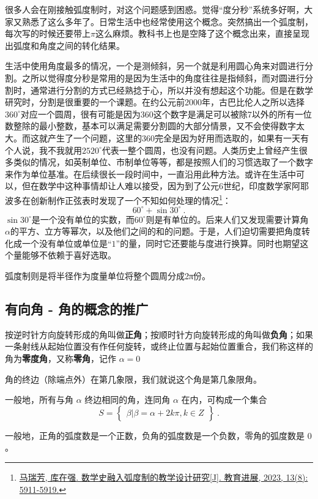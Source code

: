 很多人会在刚接触弧度制时，对这个问题感到困惑。觉得“度分秒”系统多好啊，大家又熟悉了这么多年了。日常生活中也经常使用这个概念。突然搞出一个弧度制，每次写的时候还要带上$\pi$这么麻烦。教科书上也是空降了这个概念出来，直接呈现出弧度和角度之间的转化结果。

生活中使用角度最多的情况，一个是测倾斜，另一个就是利用圆心角来对圆进行分割。之所以觉得度分秒是常用的是因为生活中的角度往往是指倾斜，而对圆进行分割时，通常进行分割的方式已经熟捻于心，所以并没有想起这个功能。但是在数学研究时，分割是很重要的一个课题。在约公元前2000年，古巴比伦人之所以选择$360^\circ$对应一个圆周，很有可能是因为360这个数字是满足可以被除7以外的所有一位数整除的最小整数，基本可以满足需要分割圆的大部分情景，又不会使得数字太大。而这就产生了一个问题，这里的360完全是因为好用而选取的，如果有一天有个人说，我不我就用$2520^\circ$代表一整个圆周，也没有问题。人类历史上曾经产生很多类似的情况，如英制单位、市制单位等等，都是按照人们的习惯选取了一个数字来作为单位基准。在后续很长一段时间中，一直沿用此种方法。或许在生活中可以，但在数学中这种事情却让人难以接受，因为到了公元6世纪，印度数学家阿耶波多在创新制作正弦表时发现了一个不知如何处理的情况\footnote{\href{https://www.hanspub.org/journal/PaperInformation?paperID=71063&utm_source=chatgpt.com}{马瑞芳, 库在强. 数学史融入弧度制的教学设计研究[J]. 教育进展, 2023, 13(8): 5911-5919.}}：
\begin{equation}
60^\circ+\sin30^\circ~.
\end{equation}
$\sin30^\circ$是一个没有单位的实数，而$60^\circ$则是有单位的。后来人们又发现需要计算角$\alpha$的平方、立方等幂次，以及他们之间的和的问题。于是，人们迫切需要把角度转化成一个没有单位或单位是“$1$”的量，同时它还要能与度进行换算。同时也期望这个量能够不依赖于喜好选取。

弧度制则是将半径作为度量单位将整个圆周分成2π份。

\subsection{有向角 - 角的概念的推广}


按逆时针方向旋转形成的角叫做\textbf{正角}；按顺时针方向旋转形成的角叫做\textbf{负角}；如果一条射线从起始位置没有作任何旋转，或终止位置与起始位置重合，我们称这样的角为\textbf{零度角}，又称\textbf{零角}，记作 $\alpha = 0$

角的终边（除端点外）在第几象限，我们就说这个角是第几象限角。

一般地，所有与角 $\alpha$ 终边相同的角，连同角 $\alpha$ 在内，可构成一个集合
\begin{equation}
S = \begin{Bmatrix} \beta|\beta=\alpha+2k\pi,k \in Z \end{Bmatrix}~.
\end{equation}


一般地，正角的弧度数是一个正数，负角的弧度数是一个负数，零角的弧度数是 $0$。
